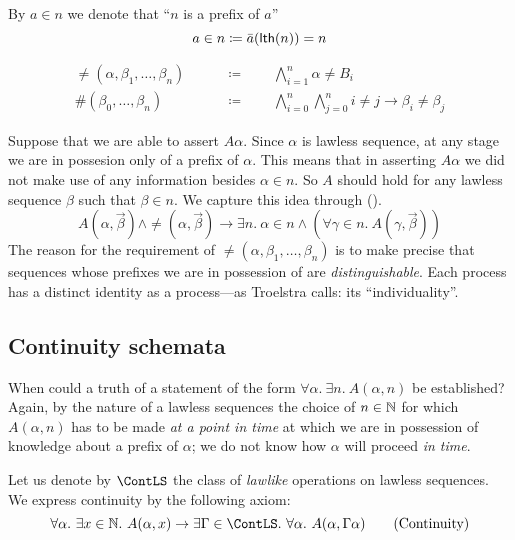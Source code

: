 \documentclass[11pt]{article}
\begin{document}
\begin{notation}
  By $a \in n$ we denote that ``$n$ is a prefix of $a$''
  \[ a \in n \coloneqq \bar{a}(\mathsf{lth}(n)) = n \]
\end{notation}

\begin{notation}
  \begin{align*}
  \neq(\alpha, \beta_1, \dots, \beta_n) \qquad &\coloneqq \qquad
    \bigwedge_{i=1}^{n} \alpha \neq B_i\\
  \#(\beta_0, \dots, \beta_n) \qquad &\coloneqq \qquad
    \bigwedge_{i=0}^n \bigwedge_{j=0}^n i \neq j \rightarrow \beta_i \neq \beta_j
  \end{align*}
\end{notation}

Suppose that we are able to assert $A\alpha$. Since $\alpha$ is lawless
sequence, at any stage we are in possesion only of a prefix of $\alpha$. This
means that in asserting $A\alpha$ we did not make use of any information
besides  $\alpha \in n$. So $A$ should hold for any lawless sequence $\beta$
such that $\beta \in n$. We capture this idea through (\LSIII).
\begin{equation}\label{LS3}
  A(\alpha, \vec{\beta}) \land \neq(\alpha, \vec{\beta})
  \rightarrow \exists n.\ \alpha \in n \land
  (\forall \gamma \in n.\ A(\gamma, \vec{\beta}))
  \tag{\LSIII}
\end{equation}
The reason for the requirement of $\neq(\alpha, \beta_1, \dots, \beta_n)$ is
to make precise that sequences whose prefixes we are in possession of are
\emph{distinguishable}. Each process has a distinct identity as a process---as
Troelstra \cite[pg. 11]{troelstra-choice-sequence} calls: its ``individuality''.

\subsection{Continuity schemata}

When could a truth of a statement of the form
$\forall \alpha.\ \exists n.\ A(\alpha, n)$ be established? Again, by the
nature of a lawless sequences the choice of $n \in \mathbb{N}$ for which
$A(\alpha, n)$ has to be made \emph{at a point in time} at which we are in
possession of knowledge about a prefix of $\alpha$; we do not know how
$\alpha$ will proceed \emph{in time}.

Let us denote by $\ContLS$ the class of \emph{lawlike} operations on lawless
sequences. We express continuity by the following axiom:
\begin{equation}\label{eq:contintuity}
  \forall \alpha.\ \exists x \in \nat.\ A(\alpha, x) \rightarrow \exists
  \Gamma \in \ContLS.\ \forall \alpha.\ A(\alpha, \Gamma\alpha)
  \tag{Continuity}
\end{equation}
\end{document}
